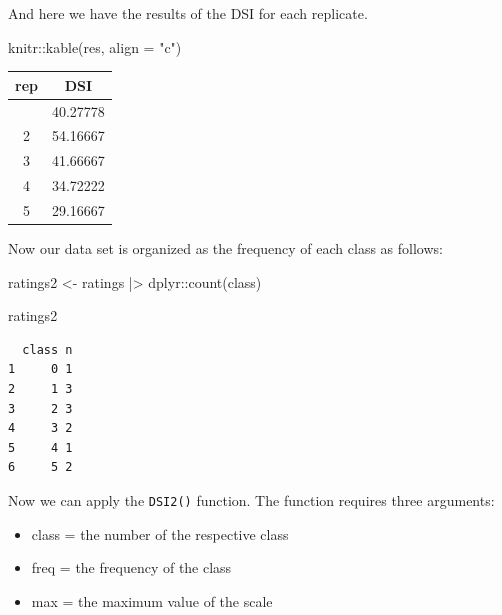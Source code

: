 \documentclass[
  letterpaper,
  DIV=11,
  numbers=noendperiod]{scrreprt}
\newenvironment{Shaded}{\begin{snugshade}}{\end{snugshade}}
\newcommand{\AttributeTok}[1]{\textcolor[rgb]{0.40,0.45,0.13}{#1}}
\newcommand{\DecValTok}[1]{\textcolor[rgb]{0.68,0.00,0.00}{#1}}
\newcommand{\FunctionTok}[1]{\textcolor[rgb]{0.28,0.35,0.67}{#1}}
\newcommand{\NormalTok}[1]{\textcolor[rgb]{0.00,0.23,0.31}{#1}}
\newcommand{\OtherTok}[1]{\textcolor[rgb]{0.00,0.23,0.31}{#1}}
\newcommand{\SpecialCharTok}[1]{\textcolor[rgb]{0.37,0.37,0.37}{#1}}
\newcommand{\StringTok}[1]{\textcolor[rgb]{0.13,0.47,0.30}{#1}}
\providecommand{\tightlist}{%
  \setlength{\itemsep}{0pt}\setlength{\parskip}{0pt}}\usepackage{longtable,booktabs,array}
\begin{document}
And here we have the results of the DSI for each replicate.

\begin{Shaded}
\begin{Highlighting}[]
\NormalTok{knitr}\SpecialCharTok{::}\FunctionTok{kable}\NormalTok{(res, }\AttributeTok{align =} \StringTok{"c"}\NormalTok{)}
\end{Highlighting}
\end{Shaded}

\begin{longtable}[]{@{}cc@{}}
\toprule\noalign{}
rep & DSI \\
\midrule\noalign{}
\endhead
\bottomrule\noalign{}
\endlastfoot
1 & 40.27778 \\
2 & 54.16667 \\
3 & 41.66667 \\
4 & 34.72222 \\
5 & 29.16667 \\
\end{longtable}

Now our data set is organized as the frequency of each class as follows:

\begin{Shaded}
\begin{Highlighting}[]
\NormalTok{ratings2 }\OtherTok{\textless{}{-}}\NormalTok{ ratings }\SpecialCharTok{|\textgreater{}} 
\NormalTok{  dplyr}\SpecialCharTok{::}\FunctionTok{count}\NormalTok{(class)}

\NormalTok{ratings2}
\end{Highlighting}
\end{Shaded}

\begin{verbatim}
  class n
1     0 1
2     1 3
3     2 3
4     3 2
5     4 1
6     5 2
\end{verbatim}

Now we can apply the \texttt{DSI2()} function. The function requires
three arguments:

\begin{itemize}
\tightlist
\item
  class = the number of the respective class
\item
  freq = the frequency of the class
\item
  max = the maximum value of the scale
\end{itemize}

\begin{Shaded}
\end{Shaded}
\end{document}
